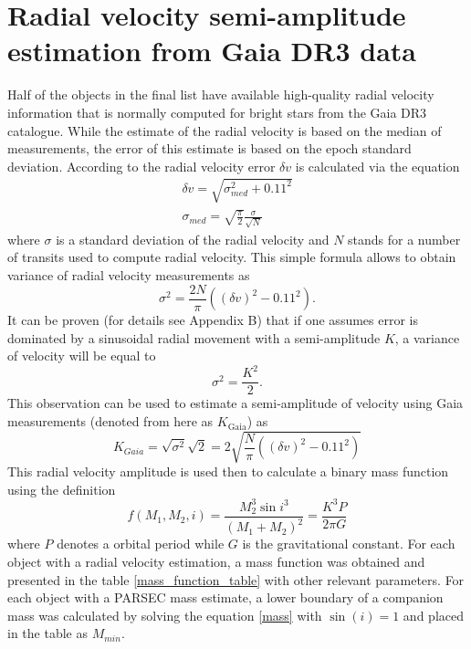 \documentclass{pracalicmgr}
\begin{document}
\section{Radial velocity semi-amplitude estimation from Gaia DR3 data}
Half of the objects in the final list have available high-quality radial velocity information that is normally computed for bright stars from the Gaia DR3 catalogue.
While the estimate of the radial velocity is based on the median of measurements, 
the error of this estimate is based on the epoch standard deviation. According to \citet{katz_gaia_2022} the radial velocity error $\delta v$ 
is calculated via the equation
\begin{align}
    \delta v=\sqrt{\sigma_{med}^2+0.11^2}\\
    \sigma_{med}=\sqrt{\frac{\pi}{2}}\frac{\sigma}{\sqrt{N}}
\end{align}
where $\sigma$ is a standard deviation of the radial velocity and $N$ stands for a number of transits used to compute radial velocity. This simple formula allows to obtain variance of 
radial velocity measurements as 
\begin{equation}
    \sigma^2=\frac{2N}{\pi}\left((\delta v)^2-0.11^2\right).
\end{equation}
It can be proven (for details see Appendix B) that if one assumes error is dominated by a sinusoidal radial movement with a semi-amplitude $K$,
a variance of velocity will be equal to
\begin{equation}
    \sigma^2=\frac{K^2}{2}.
\end{equation}
This observation can be used to estimate a semi-amplitude of velocity using Gaia measurements (denoted from here as $K_{\textrm{Gaia}}$) as 
\begin{equation}
    K_{Gaia}=\sqrt{\sigma^2}\sqrt{2}=2\sqrt{\frac{N}{\pi}\left((\delta v)^2-0.11^2\right)}
\end{equation}
This radial velocity amplitude is used then to calculate a binary mass function using the definition 
\begin{equation}\label{mass}
    f(M_1,M_2,i)=\frac{M_2^3 \sin{i}^3}{(M_1+M_2)^2}=\frac{K^3 P}{2\pi G}
\end{equation}
where $P$ denotes a orbital period while $G$ is the gravitational constant. For each object with a radial velocity estimation, a mass function was obtained
and presented in the table \ref{mass_function_table} with other relevant parameters.
For each object with a PARSEC mass estimate, a lower boundary of a companion mass was calculated by solving the equation \ref{mass}
with $\sin{(i)}=1$ and placed in the table as $M_{min}$.
\end{document}
